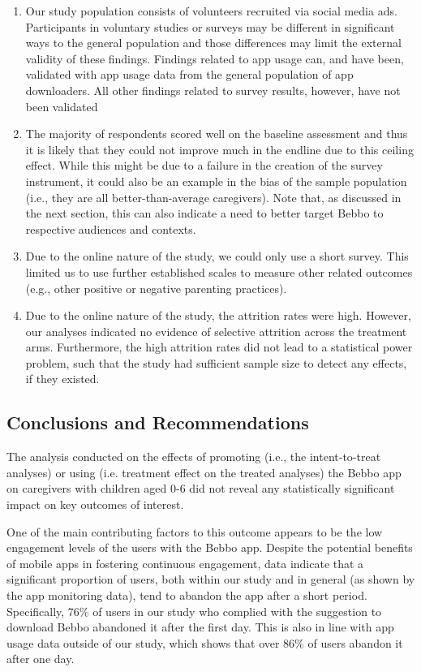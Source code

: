 \documentclass{article}
\begin{document}
\begin{enumerate}
\item Our study population consists of volunteers recruited via social media ads. Participants in voluntary studies or surveys may be different in significant ways to the general population and those differences may limit the external validity of these findings. Findings related to app usage can, and have been, validated with app usage data from the general population of app downloaders. All other findings related to survey results, however, have not been validated
\item The majority of respondents scored well on the baseline assessment and thus it is likely that they could not improve much in the endline due to this ceiling effect. While this might be due to a failure in the creation of the survey instrument, it could also be an example in the bias of the sample population (i.e., they are all better-than-average caregivers). Note that, as discussed in the next section, this can also indicate a need to better target Bebbo to respective audiences and contexts.
\item Due to the online nature of the study, we could only use a short survey. This limited us to use further established scales to measure other related outcomes (e.g., other positive or negative parenting practices).
\item Due to the online nature of the study, the attrition rates were high. However, our analyses indicated no evidence of selective attrition across the treatment arms. Furthermore, the high attrition rates did not lead to a statistical power problem, such that the study had sufficient sample size to detect any effects, if they existed.
\end{enumerate}


\subsection{Conclusions and Recommendations}

The analysis conducted on the effects of promoting (i.e., the intent-to-treat analyses) or using (i.e. treatment effect on the treated analyses) the Bebbo app on caregivers with children aged 0-6 did not reveal any statistically significant impact on key outcomes of interest.

One of the main contributing factors to this outcome appears to be the low engagement levels of the users with the Bebbo app. Despite the potential benefits of mobile apps in fostering continuous engagement, data indicate that a significant proportion of users, both within our study and in general (as shown by the app monitoring data), tend to abandon the app after a short period. Specifically, 76\% of users in our study who complied with the suggestion to download Bebbo abandoned it after the first day. This is also in line with app usage data outside of our study, which shows that over 86\% of users abandon it after one day.
\end{document}
